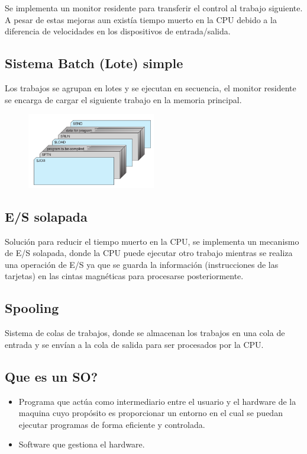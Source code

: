 \documentclass{templateNote}
\begin{document}
Se implementa un monitor residente para transferir el control al trabajo siguiente. A pesar de estas mejoras aun existía tiempo muerto en la CPU debido a la diferencia de velocidades en los dispositivos de entrada/salida.

\subsection*{Sistema Batch (Lote) simple}

Los trabajos se agrupan en lotes y se ejecutan en secuencia, el monitor residente se encarga de cargar el siguiente trabajo en la memoria principal. 

\begin{figure}[H]
    \centering
    \includegraphics[width=0.5\textwidth]{img/bash_simple.png}
\end{figure}

\subsection*{E/S solapada}

Solución para reducir el tiempo muerto en la CPU, se implementa un mecanismo de E/S solapada, donde la CPU puede ejecutar otro trabajo mientras se realiza una operación de E/S ya que se guarda la información (instrucciones de las tarjetas) en las cintas magnéticas para procesarse posteriormente.

\subsection*{Spooling} Sistema de colas de trabajos, donde se almacenan los trabajos en una cola de entrada y se envían a la cola de salida para ser procesados por la CPU.

\subsection*{Que es un SO?}

\begin{itemize}
    \item Programa que actúa como intermediario entre el usuario y el hardware de la maquina cuyo propósito es proporcionar un entorno en el cual se puedan ejecutar programas de forma eficiente y controlada. 
    \item Software que gestiona el hardware.
\end{itemize}
\end{document}
